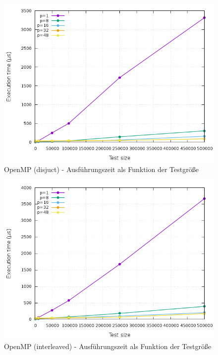 \begin{figure}[htbp]
	\centering
	\includegraphics[width=404pt]{resources/plots/OpenMP_Disjunct_cores.png}
	\caption{OpenMP (disjuct) - Ausführungszeit als Funktion der Testgröße}
	\label{OpenMP_Disjunct_cores}
\end{figure}


\begin{figure}[htbp]
	\centering
	\includegraphics[width=404pt]{resources/plots/OpenMP_Interleaved_cores.png}
	\caption{OpenMP (interleaved) - Ausführungszeit als Funktion der Testgröße}
	\label{OpenMP_Interleaved_cores}
\end{figure}



